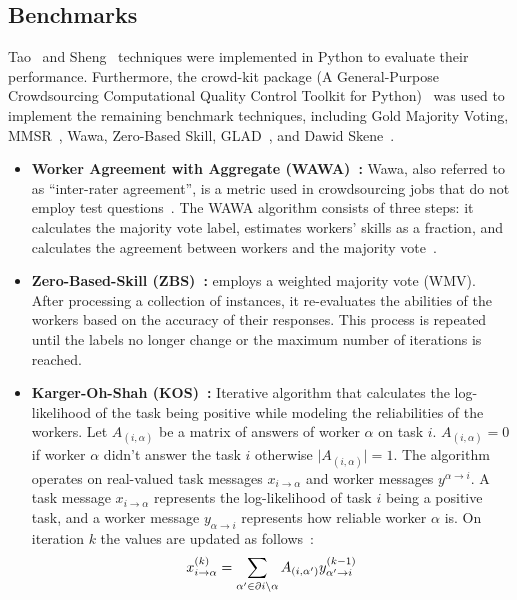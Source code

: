 \documentclass[default]{bst/sn-jnl_mine}%
\begin{document}
\subsection{Benchmarks}
Tao~\cite{tao_Label_2020} and Sheng~\cite{sheng_Majority_2019} techniques were implemented in Python to evaluate their performance. Furthermore, the crowd-kit package (A General-Purpose Crowdsourcing Computational Quality Control Toolkit for Python)~\cite{ustalov_learning_2021} was used to implement the remaining benchmark techniques, including Gold Majority Voting, MMSR~\cite{ma_Adversarial_2020}, Wawa, Zero-Based Skill, GLAD~\cite{whitehill_Whose_2009}, and Dawid Skene~\cite{dawid_Maximum_1979}.
\begin{itemize}
    \item \textbf{Worker Agreement with Aggregate (WAWA)~\cite{crowdkit_webpage_documentation}:} Wawa, also referred to as ``inter-rater agreement'', is a metric used in crowdsourcing jobs that do not employ test questions~\cite{appen_wawa_2023}. The WAWA algorithm consists of three steps: it calculates the majority vote label, estimates workers' skills as a fraction, and calculates the agreement between workers and the majority vote~\cite{crowdkit_webpage_documentation}.
    \item \textbf{Zero-Based-Skill (ZBS)~\cite{crowdkit_webpage_documentation}:} employs a weighted majority vote (WMV). After processing a collection of instances, it re-evaluates the abilities of the workers based on the accuracy of their responses. This process is repeated until the labels no longer change or the maximum number of iterations is reached.
    \item \textbf{Karger-Oh-Shah (KOS)~\cite{crowdkit_webpage_documentation}:} Iterative algorithm that calculates the log-likelihood of the task being positive while modeling the reliabilities of the workers. Let $A_{(i,\alpha)} $ be a matrix of answers of worker $\alpha $ on task $i $. $A_{(i,\alpha)} = 0 $ if worker $\alpha $ didn't answer the task $i $ otherwise $\vert A_{(i,\alpha)} \vert = 1 $. The algorithm operates on real-valued task messages $x_{i \rightarrow \alpha} $  and worker messages $y^{\alpha \rightarrow i} $. A task message $x_{i \rightarrow \alpha} $ represents the log-likelihood of task $i $ being a positive task, and a worker message $y_{\alpha \rightarrow i} $ represents how reliable worker $\alpha $ is. On iteration $k$ the values are updated as follows~\cite{crowdkit_webpage_documentation}:
    \begin{equation}
        x_{i \rightarrow \alpha}^{(k)} = \sum_{\alpha' \in \partial i \backslash \alpha} A_{(i, \alpha')} y_{\alpha' \rightarrow i}^{(k-1)} \\

\end{equation}
\end{itemize}
\end{document}
